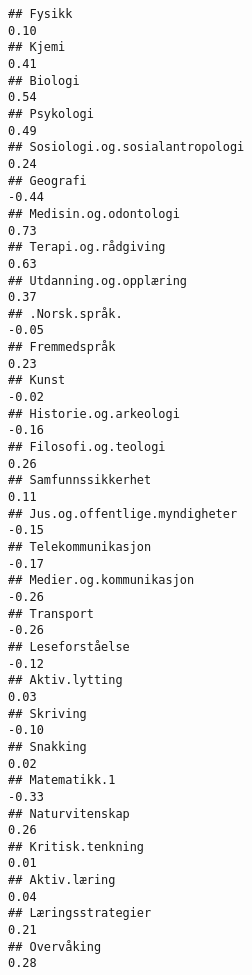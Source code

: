 \documentclass[
]{article}
\begin{document}
\begin{verbatim}
## Fysikk                                                                            0.10
## Kjemi                                                                             0.41
## Biologi                                                                           0.54
## Psykologi                                                                         0.49
## Sosiologi.og.sosialantropologi                                                    0.24
## Geografi                                                                         -0.44
## Medisin.og.odontologi                                                             0.73
## Terapi.og.rådgiving                                                               0.63
## Utdanning.og.opplæring                                                            0.37
## .Norsk.språk.                                                                    -0.05
## Fremmedspråk                                                                      0.23
## Kunst                                                                            -0.02
## Historie.og.arkeologi                                                            -0.16
## Filosofi.og.teologi                                                               0.26
## Samfunnssikkerhet                                                                 0.11
## Jus.og.offentlige.myndigheter                                                    -0.15
## Telekommunikasjon                                                                -0.17
## Medier.og.kommunikasjon                                                          -0.26
## Transport                                                                        -0.26
## Leseforståelse                                                                   -0.12
## Aktiv.lytting                                                                     0.03
## Skriving                                                                         -0.10
## Snakking                                                                          0.02
## Matematikk.1                                                                     -0.33
## Naturvitenskap                                                                    0.26
## Kritisk.tenkning                                                                  0.01
## Aktiv.læring                                                                      0.04
## Læringsstrategier                                                                 0.21
## Overvåking                                                                        0.28

\end{verbatim}
\end{document}
